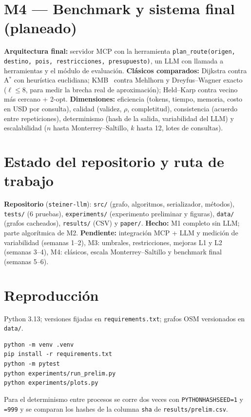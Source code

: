 \documentclass[conference,10pt]{IEEEtran}
\begin{document}
\section{M4 --- Benchmark y sistema final (planeado)}
\textbf{Arquitectura final:} servidor MCP con la herramienta \texttt{plan\_route(origen, destino, pois, restricciones, presupuesto)}, un LLM con llamada a herramientas y el módulo de evaluación. \textbf{Clásicos comparados:} Dijkstra contra A$^*$ con heurística euclidiana; KMB~\cite{kmb1981} contra Mehlhorn y Dreyfus--Wagner exacto~\cite{dreyfus1971} ($\ell\le8$, para medir la brecha real de aproximación); Held--Karp contra vecino más cercano + 2-opt. \textbf{Dimensiones:} eficiencia (tokens, tiempo, memoria, costo en USD por consulta), calidad (validez, $\rho$, completitud), consistencia (acuerdo entre repeticiones), determinismo (hash de la salida, variabilidad del LLM) y escalabilidad ($n$ hasta Monterrey--Saltillo, $k$ hasta 12, lotes de consultas).

\section{Estado del repositorio y ruta de trabajo}
\textbf{Repositorio} (\texttt{steiner-llm}): \texttt{src/} (grafo, algoritmos, serializador, métodos), \texttt{tests/} (6 pruebas), \texttt{experiments/} (experimento preliminar y figuras), \texttt{data/} (grafos cacheados), \texttt{results/} (CSV) y \texttt{paper/}. \textbf{Hecho:} M1 completo sin LLM; parte algorítmica de M2. \textbf{Pendiente:} integración MCP + LLM y medición de variabilidad (semanas 1--2), M3: umbrales, restricciones, mejoras L1 y L2 (semanas 3--4), M4: clásicos, escala Monterrey--Saltillo y benchmark final (semanas 5--6).




\appendix
\section{Reproducción}
Python 3.13; versiones fijadas en \texttt{requirements.txt}; grafos OSM versionados en \texttt{data/}.
\begin{verbatim}
python -m venv .venv
pip install -r requirements.txt
python -m pytest
python experiments/run_prelim.py
python experiments/plots.py
\end{verbatim}
Para el determinismo entre procesos se corre dos veces con \texttt{PYTHONHASHSEED=1} y \texttt{=999} y se comparan los hashes de la columna \texttt{sha} de \texttt{results/prelim.csv}.
\end{document}
